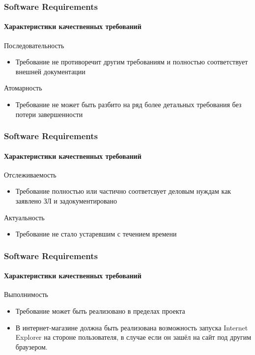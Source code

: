\documentclass[aspectratio=169, 12pt]{beamer}
\begin{document}
\begin{frame}[t]
    \frametitle{Software Requirements}
    \framesubtitle{Характеристики качественных требований}
    Последовательность \newline
    \begin{itemize}
        \item Требование не противоречит другим требованиям и полностью соответствует внешней документации \newline \pause
    \end{itemize}
    Атомарность \newline
    \begin{itemize}
        \item Требование не может быть разбито на ряд более детальных требования без потери завершенности
    \end{itemize}
\end{frame}

\begin{frame}[t]
    \frametitle{Software Requirements}
    \framesubtitle{Характеристики качественных требований}
    Отслеживаемость \newline
    \begin{itemize}
        \item Требование полностью или частично соответсвует деловым нуждам как заявлено ЗЛ и задокументировано \newline \pause
    \end{itemize}
    Актуальность \newline
    \begin{itemize}
        \item Требование не стало устаревшим с течением времени
    \end{itemize}
\end{frame}

\begin{frame}[t]
    \frametitle{Software Requirements}
    \framesubtitle{Характеристики качественных требований}
    Выполнимость \newline
    \begin{itemize}
        \item Требование может быть реализовано в пределах проекта \newline \pause
        \item В интернет-магазине должна быть реализована возможность запуска Internet Explorer на стороне
              пользователя, в случае если он зашёл на сайт под другим браузером.
    \end{itemize}
\end{frame}
\end{document}
